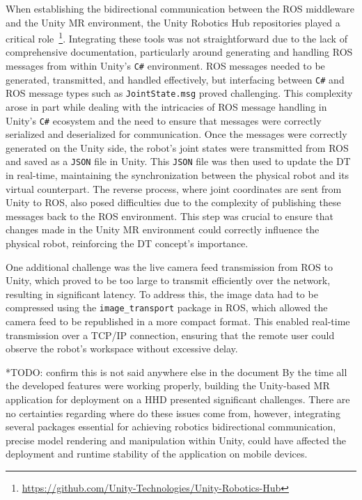 When establishing the bidirectional communication between the \ac{ROS} middleware and the Unity \ac{MR} environment, the Unity Robotics Hub repositories played a critical role~\footnote{\url{https://github.com/Unity-Technologies/Unity-Robotics-Hub}}. Integrating these tools was not straightforward due to the lack of comprehensive documentation, particularly around generating and handling \ac{ROS} messages from within Unity’s \texttt{C\#} environment. \ac{ROS} messages needed to be generated, transmitted, and handled effectively, but interfacing between \texttt{C\#} and \ac{ROS} message types such as \texttt{JointState.msg} proved challenging. This complexity arose in part while dealing with the intricacies of \ac{ROS} message handling in Unity’s \texttt{C\#} ecosystem and the need to ensure that messages were correctly serialized and deserialized for communication. Once the messages were correctly generated on the Unity side, the robot's joint states were transmitted from \ac{ROS} and saved as a \texttt{JSON} file in Unity. This \texttt{JSON} file was then used to update the \ac{DT} in real-time, maintaining the synchronization between the physical robot and its virtual counterpart. The reverse process, where joint coordinates are sent from Unity to \ac{ROS}, also posed difficulties due to the complexity of publishing these messages back to the \ac{ROS} environment. This step was crucial to ensure that changes made in the Unity \ac{MR} environment could correctly influence the physical robot, reinforcing the \ac{DT} concept's importance.

One additional challenge was the live camera feed transmission from \ac{ROS} to Unity, which proved to be too large to transmit efficiently over the network, resulting in significant latency. To address this, the image data had to be compressed using the \texttt{image\_transport} package in \ac{ROS}, which allowed the camera feed to be republished in a more compact format. This enabled real-time transmission over a \ac{TCP}/\ac{IP} connection, ensuring that the remote user could observe the robot’s workspace without excessive delay.

*TODO: confirm this is not said anywhere else in the document
By the time all the developed features were working properly, building the Unity-based \ac{MR} application for deployment on a \ac{HHD} presented significant challenges. There are no certainties regarding where do these issues come from, however, integrating several packages essential for achieving robotics bidirectional communication, precise model rendering and manipulation within Unity, could have affected the deployment and runtime stability of the application on mobile devices.

